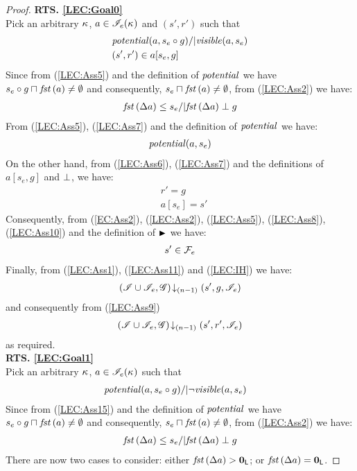 \begin{lemma}
\begin{proof}
\noindent\textbf{RTS. \ref{LEC:Goal0}}\\
Pick an arbitrary $\kappa_{}$, $a \in \mathscr{I}_e(\kappa_{})$ and $(s', r')$ such that
%
\begin{align}
	& \mathit{potential}(a, s_e \circ g) /| \mathit{visible}(a, s_e) \label{LEC:Ass5}\\
	& (s', r') \in a[s_e, g] \label{LEC:Ass6}
\end{align}
Since from (\ref{LEC:Ass5}) and the definition of $\mathit{potential}$ we have $s_e \circ g \sqcap_{} \mathit{fst}\left(a\right) \not= \emptyset$ and consequently, $s_e \sqcap_{} \mathit{fst}\left(a\right) \not= \emptyset$, from (\ref{LEC:Ass2}) we have:
%
\begin{align}
	\mathit{fst}\left(\Delta {a}\right) \leq s_e /| \mathit{fst}\left(\Delta {a}\right) \mathrel{\bot} g\label{LEC:Ass7}
\end{align}
% 
From (\ref{LEC:Ass5}), (\ref{LEC:Ass7}) and the definition of $\mathit{potential}$ we have:
%
\begin{align}
	\mathit{potential}(a, s_e) \label{LEC:Ass8}
\end{align}
%
On the other hand, from (\ref{LEC:Ass6}), (\ref{LEC:Ass7}) and the definitions of $a[s_e, g]$ and $\mathrel{\bot}$, we have: 
%
\begin{align}
	& r' = g \label{LEC:Ass9}\\
	& a[s_e] = s' \label{LEC:Ass10}
\end{align}
%
Consequently, from (\ref{EC:Ass2}), (\ref{LEC:Ass2}), (\ref{LEC:Ass5}), (\ref{LEC:Ass8}), (\ref{LEC:Ass10}) and the definition of $\strictfences$ we have:
%
\begin{align}
	s' \in  \mathcal{F}_{e}  \label{LEC:Ass11}
\end{align}
%
Finally, from (\ref{LEC:Ass1}), (\ref{LEC:Ass11}) and (\ref{LEC:IH}) we have:
%
\begin{align*}
	\left(\mathscr{I} \cup \mathscr{I}_{e}, \mathscr{G}\right) \!\downarrow_{(n-1)} \left(s', g, \mathscr{I}_e\right)
\end{align*}
%
and consequently from (\ref{LEC:Ass9})
%
\begin{align*}
	\left(\mathscr{I} \cup \mathscr{I}_{e}, \mathscr{G}\right) \!\downarrow_{(n-1)} \left(s', r', \mathscr{I}_e\right)
\end{align*}
%
as required.\\
%
%
%

\noindent\textbf{RTS. \ref{LEC:Goal1}}\\
Pick an arbitrary $\kappa_{}$, $a \in \mathscr{I}_e(\kappa_{})$ such that
%
\begin{align}
	& \mathit{potential}(a, s_e \circ g) /| \neg\mathit{visible}(a, s_e) \label{LEC:Ass15}
\end{align}
Since from (\ref{LEC:Ass15}) and the definition of $\mathit{potential}$ we have $s_e \circ g \sqcap_{} \mathit{fst}\left(a\right) \not= \emptyset$ and consequently, $s_e \sqcap_{} \mathit{fst}\left(a\right) \not= \emptyset$, from (\ref{LEC:Ass2}) we have:
%
\begin{align}
	\mathit{fst}\left(\Delta {a}\right) \leq s_e /| \mathit{fst}\left(\Delta {a}\right) \mathrel{\bot} g \label{LEC:Ass16}
\end{align}
% 
There are now two cases to consider: either $\mathit{fst}\left(\Delta {a}\right) > \mathbf{0}_{\textsf{L}}$; or $\mathit{fst}\left(\Delta {a}\right) = \mathbf{0}_{\textsf{L}}$.


\end{proof}
\end{lemma}
